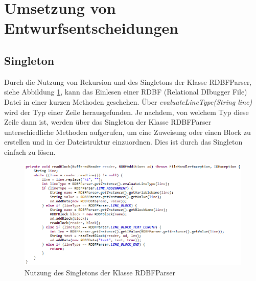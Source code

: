 \documentclass[parskip=full]{scrartcl}
\begin{document}
\section{Umsetzung von Entwurfsentscheidungen}
\subsection{Singleton}
Durch die Nutzung von Rekursion und des Singletons der Klasse RDBFParser, siehe Abbildung \ref{loadRDBF}, kann das Einlesen einer RDBF (Relational DIbugger File) Datei in einer kurzen Methoden geschehen.
Über \textit{evaluateLineType(String line)} wird der Typ einer Zeile herausgefunden. Je nachdem, von welchem Typ diese Zeile dann ist, werden über das Singleton der Klasse RDBFParser unterschiedliche Methoden aufgerufen, um eine Zuweisung oder einen Block zu erstellen und in der Dateistruktur einzuordnen. Dies ist durch das Singleton einfach zu lösen.
\begin{figure}[!h]
\includegraphics[width=1.0\textwidth]{document_data/loadRDBFFile.png}
\caption{Nutzung des Singletons der Klasse RDBFParser}
\label{loadRDBF}
\end{figure}


\newpage
\end{document}
